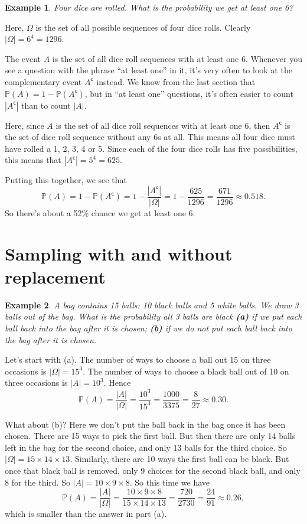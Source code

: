 \documentclass[
  a4paper,
]{book}
\theoremstyle{definition}
\theoremstyle{definition}
\newtheorem{example}{Example}[chapter]
\theoremstyle{definition}
\theoremstyle{definition}
\theoremstyle{remark}
\begin{document}
\begin{example}
\emph{Four dice are rolled. What is the probability we get at least one 6?}

Here, \(\Omega\) is the set of all possible sequences of four dice rolls. Clearly \(|\Omega| = 6^4 = 1296\).

The event \(A\) is the set of all dice roll sequences with at least one 6. Whenever you see a question with the phrase ``at least one'' in it, it's very often to look at the complementary event \(A^\mathsf{c}\) instead. We know from the last section that \(\mathbb P(A) = 1 - \mathbb P(A^\mathsf{c})\), but in ``at least one'' questions, it's often easier to count \(|A^\mathsf{c}|\) than to count \(|A|\).

Here, since \(A\) is the set of all dice roll sequences with at least one 6, then \(A^\mathsf{c}\) is the set of dice roll sequence without any 6s at all. This means all four dice must have rolled a 1, 2, 3, 4 or 5. Since each of the four dice rolls has five possibilities, this means that \(|A^\mathsf{c}| = 5^4 = 625\).

Putting this together, we see that
\[ \mathbb P(A) = 1 - \mathbb P(A^\mathsf{c}) = 1 - \frac{|A^\mathsf{c}|}{|\Omega|} = 1 - \frac{625}{1296} = \frac{671}{1296} \approx 0.518 .\]
So there's about a 52\% chance we get at least one 6.
\end{example}

\hypertarget{sampling}{%
\section{Sampling with and without replacement}\label{sampling}}

\begin{example}
\emph{A bag contains 15 balls: 10 black balls and 5 white balls. We draw 3 balls out of the bag. What is the probability all 3 balls are black \textbf{(a)} if we put each ball back into the bag after it is chosen; \textbf{(b)} if we do not put each ball back into the bag after it is chosen.}

Let's start with (a). The number of ways to choose a ball out 15 on three occasions is \(|\Omega| = 15^3\). The number of ways to choose a black ball out of 10 on three occasions is \(|A| = 10^3\). Hence
\[ \mathbb P(A) = \frac{|A|}{|\Omega|} = \frac{10^3}{15^3} =  \frac{1000}{3375} = \frac{8}{27} \approx 0.30. \]

What about (b)? Here we don't put the ball back in the bag once it has been chosen. There are 15 ways to pick the first ball. But then there are only 14 balls left in the bag for the second choice, and only 13 balls for the third choice. So \(|\Omega| = 15\times14\times13\). Similarly, there are 10 ways the first ball can be black. But once that black ball is removed, only 9 choices for the second black ball, and only 8 for the third. So \(|A| = 10\times9\times8\). So this time we have
\[ \mathbb P(A) = \frac{|A|}{|\Omega|} = \frac{10\times9\times8}{15\times14\times13} =  \frac{720}{2730} = \frac{24}{91} \approx 0.26, \]
which is smaller than the answer in part (a).
\end{example}
\end{document}
